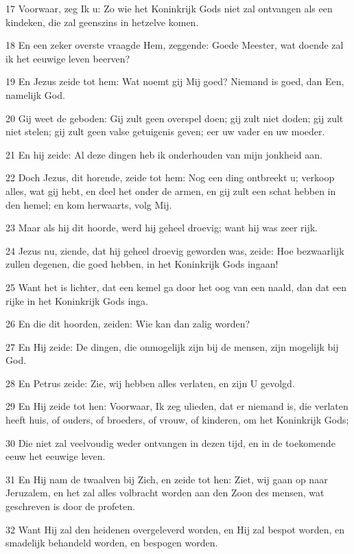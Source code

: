 \par 17 Voorwaar, zeg Ik u: Zo wie het Koninkrijk Gods niet zal ontvangen als een kindeken, die zal geenszins in hetzelve komen.
\par 18 En een zeker overste vraagde Hem, zeggende: Goede Meester, wat doende zal ik het eeuwige leven beerven?
\par 19 En Jezus zeide tot hem: Wat noemt gij Mij goed? Niemand is goed, dan Een, namelijk God.
\par 20 Gij weet de geboden: Gij zult geen overspel doen; gij zult niet doden; gij zult niet stelen; gij zult geen valse getuigenis geven; eer uw vader en uw moeder.
\par 21 En hij zeide: Al deze dingen heb ik onderhouden van mijn jonkheid aan.
\par 22 Doch Jezus, dit horende, zeide tot hem: Nog een ding ontbreekt u; verkoop alles, wat gij hebt, en deel het onder de armen, en gij zult een schat hebben in den hemel; en kom herwaarts, volg Mij.
\par 23 Maar als hij dit hoorde, werd hij geheel droevig; want hij was zeer rijk.
\par 24 Jezus nu, ziende, dat hij geheel droevig geworden was, zeide: Hoe bezwaarlijk zullen degenen, die goed hebben, in het Koninkrijk Gods ingaan!
\par 25 Want het is lichter, dat een kemel ga door het oog van een naald, dan dat een rijke in het Koninkrijk Gods inga.
\par 26 En die dit hoorden, zeiden: Wie kan dan zalig worden?
\par 27 En Hij zeide: De dingen, die onmogelijk zijn bij de mensen, zijn mogelijk bij God.
\par 28 En Petrus zeide: Zie, wij hebben alles verlaten, en zijn U gevolgd.
\par 29 En Hij zeide tot hen: Voorwaar, Ik zeg ulieden, dat er niemand is, die verlaten heeft huis, of ouders, of broeders, of vrouw, of kinderen, om het Koninkrijk Gods;
\par 30 Die niet zal veelvoudig weder ontvangen in dezen tijd, en in de toekomende eeuw het eeuwige leven.
\par 31 En Hij nam de twaalven bij Zich, en zeide tot hen: Ziet, wij gaan op naar Jeruzalem, en het zal alles volbracht worden aan den Zoon des mensen, wat geschreven is door de profeten.
\par 32 Want Hij zal den heidenen overgeleverd worden, en Hij zal bespot worden, en smadelijk behandeld worden, en bespogen worden.
